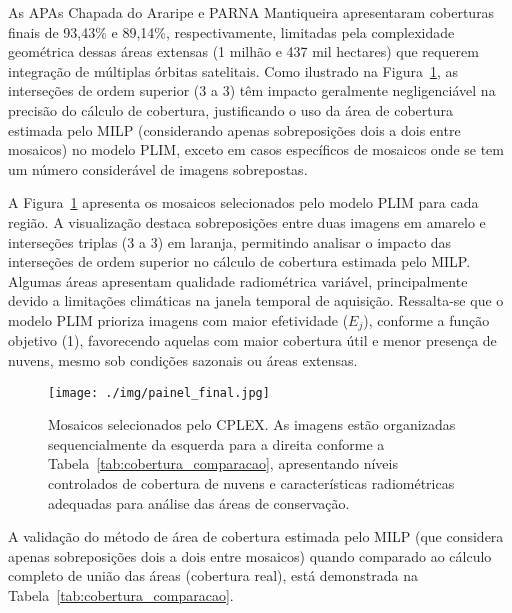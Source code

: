\documentclass[a4paper,11pt]{article}
\begin{document}
As APAs Chapada do Araripe e PARNA Mantiqueira apresentaram coberturas finais de 93,43\% e 89,14\%, respectivamente, limitadas pela complexidade geométrica dessas áreas extensas (1 milhão e 437 mil hectares) que requerem integração de múltiplas órbitas satelitais. Como ilustrado na Figura~\ref{fig:intersecoes}, as interseções de ordem superior ($3$ a $3$) têm impacto geralmente negligenciável na precisão do cálculo de cobertura, justificando o uso da área de cobertura estimada pelo MILP (considerando apenas sobreposições dois a dois entre mosaicos) no modelo PLIM, exceto em casos específicos de mosaicos onde se tem um número considerável de imagens sobrepostas.

A Figura~\ref{fig:intersecoes} apresenta os mosaicos selecionados pelo modelo PLIM para cada região. A visualização destaca sobreposições entre duas imagens em amarelo e interseções triplas ($3$ a $3$) em laranja, permitindo analisar o impacto das interseções de ordem superior no cálculo de cobertura estimada pelo MILP. Algumas áreas apresentam qualidade radiométrica variável, principalmente devido a limitações climáticas na janela temporal de aquisição. Ressalta-se que o modelo PLIM prioriza imagens com maior efetividade ($E_j$), conforme a função objetivo (1), favorecendo aquelas com maior cobertura útil e menor presença de nuvens, mesmo sob condições sazonais ou áreas extensas.

\begin{figure}[H]
    \centering
    \texttt{[image: ./img/painel\_final.jpg]}
\caption{Mosaicos selecionados pelo CPLEX. As imagens estão organizadas sequencialmente da esquerda para a direita conforme a Tabela~\ref{tab:cobertura_comparacao}, apresentando níveis controlados de cobertura de nuvens e características radiométricas adequadas para análise das áreas de conservação.}
    \label{fig:intersecoes}
\end{figure}

\vspace{-5mm}
A validação do método de área de cobertura estimada pelo MILP (que considera apenas sobreposições dois a dois entre mosaicos) quando comparado ao cálculo completo de união das áreas (cobertura real), está demonstrada na Tabela~\ref{tab:cobertura_comparacao}.
\end{document}

